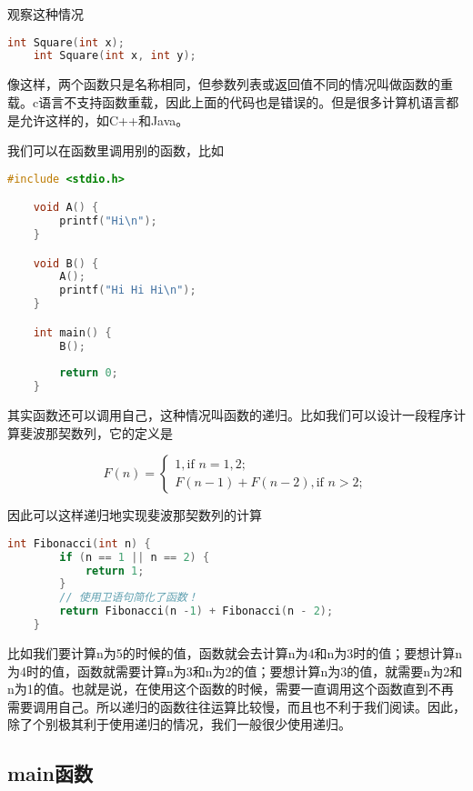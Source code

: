 观察这种情况

\begin{lstlisting}[language=C]
    int Square(int x);
    int Square(int x, int y);
\end{lstlisting}

像这样，两个函数只是名称相同，但参数列表或返回值不同的情况叫做函数的重载。c语言不支持函数重载，因此上面的代码也是错误的。但是很多计算机语言都是允许这样的，如C++和Java。

我们可以在函数里调用别的函数，比如

\begin{lstlisting}[language=C]
    #include <stdio.h>

    void A() {
        printf("Hi\n");
    }

    void B() {
        A();
        printf("Hi Hi Hi\n");
    }

    int main() {
        B();
        
        return 0;
    }
\end{lstlisting}

其实函数还可以调用自己，这种情况叫函数的递归。比如我们可以设计一段程序计算斐波那契数列，它的定义是

\begin{equation*}
   F(n) = \begin{cases}
    1, \text{if } n = 1, 2;\\
    F(n - 1) + F(n - 2), \text{if } n > 2;
   \end{cases} 
\end{equation*}

因此可以这样递归地实现斐波那契数列的计算

\begin{lstlisting}[language=C]
    int Fibonacci(int n) {
        if (n == 1 || n == 2) {
            return 1;
        }
        // 使用卫语句简化了函数！
        return Fibonacci(n -1) + Fibonacci(n - 2);
    }
\end{lstlisting}

比如我们要计算n为5的时候的值，函数就会去计算n为4和n为3时的值；要想计算n为4时的值，函数就需要计算n为3和n为2的值；要想计算n为3的值，就需要n为2和n为1的值。也就是说，在使用这个函数的时候，需要一直调用这个函数直到不再需要调用自己。所以递归的函数往往运算比较慢，而且也不利于我们阅读。因此，除了个别极其利于使用递归的情况，我们一般很少使用递归。

\subsection{main函数}

